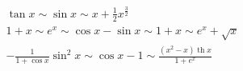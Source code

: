 \begin{eqnarray*}
\tan x \sim \sin x \sim x+\frac{1}{2}x^\frac{3}{2}\\
1+x \sim e^x \sim \cos x -\sin x \sim 1+x \sim e^x +\sqrt x \\
-\frac{1}{1+\cos x}\sin ^2 x \sim \cos x-1 \sim 
\frac{(x^2-x)\mathop{\mathrm{th}}x}{1+e^x}
\end{eqnarray*}